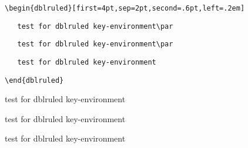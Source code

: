 \documentclass{article}
\begin{document}
\verb+\begin{dblruled}[first=4pt,sep=2pt,second=.6pt,left=.2em]+\par
\verb+   test for dblruled key-environment\par+\par
\verb+   test for dblruled key-environment\par+\par
\verb+   test for dblruled key-environment+\par
\verb+\end{dblruled}+

\begin{dblruled}[first=4pt,sep=2pt,second=.6pt,left=.2em]
 test for dblruled key-environment\par
 test for dblruled key-environment\par
 test for dblruled key-environment
\end{dblruled}
\end{document}
